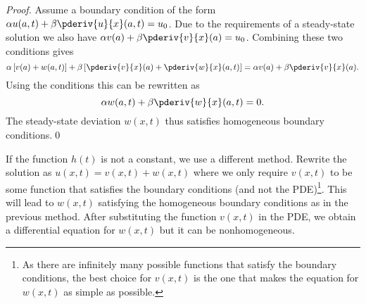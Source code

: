     \begin{proof}
        Assume a boundary condition of the form $\alpha u(a,t) + \beta\pderiv{u}{x}(a,t) = u_0$. Due to the requirements of a steady-state solution we also have $\alpha v(a) + \beta\pderiv{v}{x}(a) = u_0$. Combining these two conditions gives \[\alpha\left[v(a) + w(a,t)\right] + \beta\left[\pderiv{v}{x}(a) + \pderiv{w}{x}(a,t)\right] = \alpha v(a) + \beta\pderiv{v}{x}(a).\] Using the conditions this can be rewritten as \[\alpha w(a,t) + \beta\pderiv{w}{x}(a,t) = 0.\] The steady-state deviation $w(x,t)$ thus satisfies homogeneous boundary conditions.\qed
    \end{proof}

    \begin{method}
        If the function $h(t)$ is not a constant, we use a different method. Rewrite the solution as $u(x,t) = v(x,t) + w(x,t)$ where we only require $v(x,t)$ to be some function that satisfies the boundary conditions (and not the PDE)\footnote{As there are infinitely many possible functions that satisfy the boundary conditions, the best choice for $v(x,t)$ is the one that makes the equation for $w(x,t)$ as simple as possible.}. This will lead to $w(x,t)$ satisfying the homogeneous boundary conditions as in the previous method. After substituting the function $v(x,t)$ in the PDE, we obtain a differential equation for $w(x,t)$ but it can be nonhomogeneous.
    \end{method}

